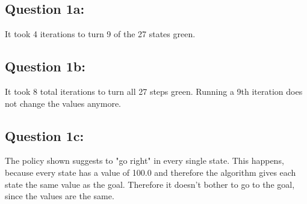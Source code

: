\subsection*{Question 1a:}\label{sec:1a}

It took 4 iterations to turn 9 of the 27 states green.

\subsection*{Question 1b:}\label{sec:1b}

It took 8 total iterations to turn all 27 steps green.
Running a 9th iteration does not change the values anymore.

\subsection*{Question 1c:}\label{sec:1c}

The policy shown suggests to "go right" in every single state.
This happens, because every state has a value of 100.0 and therefore the algorithm gives each state the same value as the goal.
Therefore it doesn't bother to go to the goal, since the values are the same.


